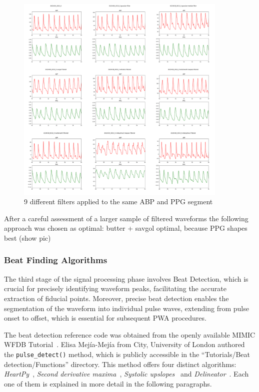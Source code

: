 \begin{figure}[h]
    \includegraphics[width=0.9\textwidth]{images/methods/filters}
    \caption{9 different filters applied to the same ABP and PPG segment}
    \label{fig:filters}
\end{figure}

After a careful assessment of a larger sample of filtered waveforms the following approach was chosen as optimal:
butter + savgol optimal, because PPG shapes best (show pic)

\subsubsection{Beat Finding Algorithms}
\label{subsubsec:beats}

The third stage of the signal processing phase involves Beat Detection, which is crucial for precisely identifying waveform peaks, facilitating the accurate extraction of fiducial points.
Moreover, precise beat detection enables the segmentation of the waveform into individual pulse waves, extending from pulse onset to offset, which is essential for subsequent PWA procedures.

The beat detection reference code was obtained from the openly available MIMIC WFDB Tutorial~\cite{charltonMIMICWFDBTutorials2022}.
Elisa Mejía-Mejía from City, University of London authored the \texttt{pulse\_detect()} method, which is publicly accessible in the \enquote{Tutorials/Beat detection/Functions} directory.
This method offers four distinct algorithms: \textit{HeartPy}~\cite{vangentHeartPyNovelHeart2019}, \textit{Second derivative maxima}~\cite{elgendiSystolicPeakDetection2013},
\textit{Systolic upslopes}~\cite{arguellopradaNovelLowcomplexityPeak2018} and \textit{Delineator}~\cite{aboyAutomaticBeatDetection2005}.
Each one of them is explained in more detail in the following paragraphs.

